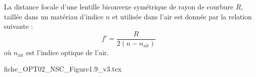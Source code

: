 

\finEntrainement









\hauteurLargeurCadreReponse		{8mm}{2cm}
\typeEntrainement				{} %
\initialisationEntrainement

\smallskip
                                \initialisationPartieGauche %
La distance focale d'une lentille biconvexe symétrique de rayon de courbure $R$, taillée dans un matériau d'indice $n$ et utilisée dans l'air est donnée par la relation suivante : 
\[
f'=\frac{R}{2(n-n_{\text{air}})}
\]
où $n_{\text{air}}$ est l'indice optique de l'air.
                                \initialisationPartieDroite %
\begin{center}
{fiche_OPT02_NSC_Figure1.9_v3.tex}
\end{center}
                               \finalisationDuPartageDePage %

